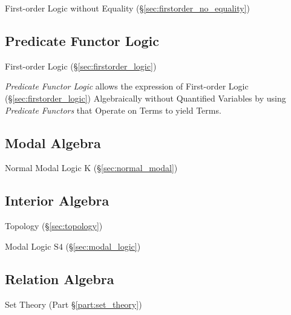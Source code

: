 First-order Logic without Equality
(\S\ref{sec:firstorder_no_equality})



\subsection{Predicate Functor Logic}\label{sec:pfl}

First-order Logic (\S\ref{sec:firstorder_logic})

\emph{Predicate Functor Logic} allows the expression of First-order
Logic (\S\ref{sec:firstorder_logic}) Algebraically without Quantified
Variables by using \emph{Predicate Functors} that Operate on Terms to
yield Terms.



\subsection{Modal Algebra}\label{sec:modal_algebra}

Normal Modal Logic $\mathrm{K}$ (\S\ref{sec:normal_modal})



\subsection{Interior Algebra}\label{sec:interior_algebra}

Topology (\S\ref{sec:topology})

Modal Logic $\mathrm{S4}$ (\S\ref{sec:modal_logic})



\subsection{Relation Algebra}\label{sec:relation_algebra}

Set Theory (Part \S\ref{part:set_theory})



